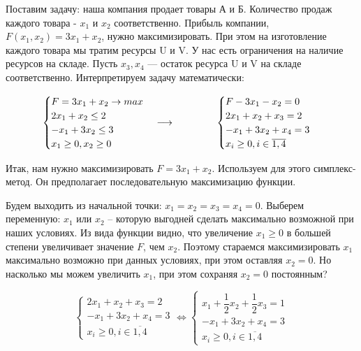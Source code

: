 Поставим задачу: наша компания продает товары А и Б. Количество продаж каждого товара - $x_1$ и $x_2$ соответственно.
Прибыль компании, $F(x_1, x_2) = 3x_1 + x_2$, нужно максимизировать. При этом на изготовление каждого товара мы тратим ресурсы U и V.
У нас есть ограничения на наличие ресурсов на складе. Пусть $x_3, x_4$ --- остаток ресурса U и V на складе соответственно.
Интерпретируем задачу математически:

\begin{align*}
    \begin{cases}
        F = 3x_1 + x_2\to max\\
        2x_1 + x_2 \leq 2\\
        -x_1 + 3 x_2 \leq 3\\
        x_1 \geq 0, x_2 \geq 0
    \end{cases} \longrightarrow
    \hspace{1.5cm}
    \begin{cases}
        F - 3x_1 - x_2 = 0\\
        2x_1 + x_2 + x_3 = 2\\
        -x_1 + 3x_2 + x_4 = 3\\
        x_{i} \geq 0, i\in\overline{1,4}
    \end{cases}
\end{align*}

Итак, нам нужно максимизировать $F = 3x_1 + x_2$. Используем для этого симплекс-метод. Он предполагает последовательную максимизацию
функции. 

Будем выходить из начальной точки: $x_1 = x_2 = x_3 = x_4 = 0$.
Выберем переменную: $x_1$ или $x_2$ -- которую выгодней сделать максимально возможной при наших условиях.
Из вида функции видно, что увеличение $x_1 \geq 0$ в большей степени увеличивает значение $F$, чем $x_2$.
Поэтому стараемся максимизировать $x_1$ максимально возможно при данных условиях, при этом оставляя $x_2 = 0$. 
Но насколько мы можем увеличить $x_1$, при этом сохраняя $x_2 = 0$ постоянным?

\[
    \begin{cases}
        2x_1 + x_2 + x_3 = 2\\
        -x_1 + 3x_2 + x_4 = 3\\
        x_{i} \geq 0, i\in\overline{1,4}
    \end{cases} 
    \Leftrightarrow
    \begin{cases}
        x_1 + \dfrac{1}{2}x_2 + \dfrac{1}{2}x_3 = 1\\ 
        -x_1 + 3x_2 + x_4 = 3\\
        x_{i} \geq 0, i\in\overline{1,4}
    \end{cases}
\]

